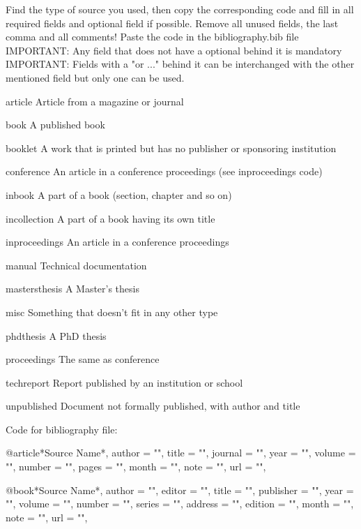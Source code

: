 Find the type of source you used, then copy the corresponding code and fill in all required fields and optional field if possible.
Remove all unused fields, the last comma and all comments!
Paste the code in the bibliography.bib file
IMPORTANT: Any field that does not have a optional behind it is mandatory
IMPORTANT: Fields with a "or ..." behind it can be interchanged with the other mentioned field but only one can be used.

article
    Article from a magazine or journal

book
    A published book

booklet
    A work that is printed but has no publisher or sponsoring institution

conference
    An article in a conference proceedings (see inproceedings code)

inbook
    A part of a book (section, chapter and so on)

incollection
    A part of a book having its own title

inproceedings
    An article in a conference proceedings

manual
    Technical documentation

mastersthesis
    A Master's thesis

misc
    Something that doesn't fit in any other type

phdthesis
    A PhD thesis

proceedings
    The same as conference

techreport
    Report published by an institution or school

unpublished
    Document not formally published, with author and title




Code for bibliography file:
    
@article{*Source Name*,
    author      = "",
    title       = "",
    journal     = "",
    year        = "",
    volume      = "",   %
    number      = "",   %
    pages       = "",   %
    month       = "",   %
    note        = "",   %
    url         = "",   %
}

@book{*Source Name*,
    author      = "",   %
    editor      = "",   %
    title       = "",
    publisher   = "",
    year        = "",
    volume      = "",   %
    number      = "",   %
    series      = "",   %
    address     = "",   %
    edition     = "",   %
    month       = "",   %
    note        = "",   %
    url         = "",   %
}

